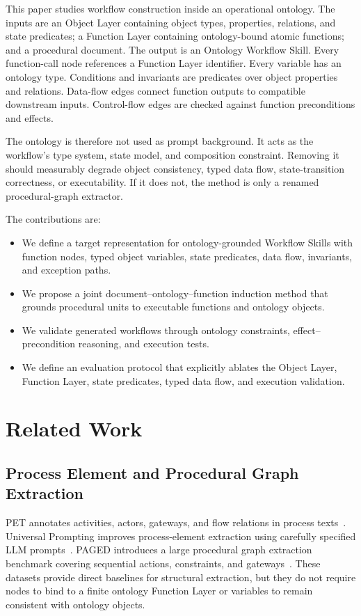 \documentclass[10pt,twocolumn]{article}
\begin{document}
This paper studies workflow construction inside an operational ontology. The inputs are an Object Layer containing object types, properties, relations, and state predicates; a Function Layer containing ontology-bound atomic functions; and a procedural document. The output is an Ontology Workflow Skill. Every function-call node references a Function Layer identifier. Every variable has an ontology type. Conditions and invariants are predicates over object properties and relations. Data-flow edges connect function outputs to compatible downstream inputs. Control-flow edges are checked against function preconditions and effects.

The ontology is therefore not used as prompt background. It acts as the workflow's type system, state model, and composition constraint. Removing it should measurably degrade object consistency, typed data flow, state-transition correctness, or executability. If it does not, the method is only a renamed procedural-graph extractor.

The contributions are:
\begin{itemize}
    \item We define a target representation for ontology-grounded Workflow Skills with function nodes, typed object variables, state predicates, data flow, invariants, and exception paths.
    \item We propose a joint document--ontology--function induction method that grounds procedural units to executable functions and ontology objects.
    \item We validate generated workflows through ontology constraints, effect--precondition reasoning, and execution tests.
    \item We define an evaluation protocol that explicitly ablates the Object Layer, Function Layer, state predicates, typed data flow, and execution validation.
\end{itemize}

\section{Related Work}
\subsection{Process Element and Procedural Graph Extraction}
PET annotates activities, actors, gateways, and flow relations in process texts~\cite{bellan2022pet}. Universal Prompting improves process-element extraction using carefully specified LLM prompts~\cite{neuberger2024universal}. PAGED introduces a large procedural graph extraction benchmark covering sequential actions, constraints, and gateways~\cite{du2024paged}. These datasets provide direct baselines for structural extraction, but they do not require nodes to bind to a finite ontology Function Layer or variables to remain consistent with ontology objects.
\end{document}

